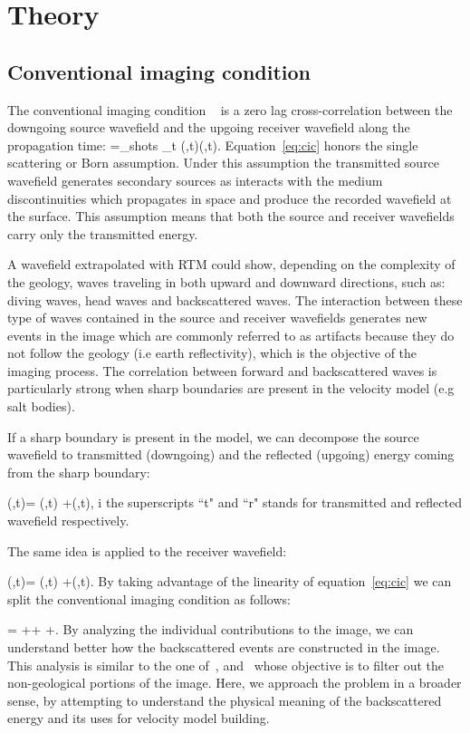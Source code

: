 \section{Theory}

\subsection{Conventional imaging condition}
The conventional imaging condition ~\citep{Claerbout:1985:IEI:3887}
is a zero lag cross-correlation between the downgoing source wavefield and the upgoing 
receiver wavefield along the propagation time:
%
\beq
\R=\sum_{shots} \sum_{t} \US(\xx,t)\UR(\xx,t).
\label{eq:cic}
\eeq
%
 Equation~\ref{eq:cic} honors the single scattering or Born assumption. Under this assumption the transmitted
source wavefield generates secondary sources as interacts with the medium discontinuities which propagates in 
space and produce the recorded wavefield at the surface. This assumption means that both the source and receiver
wavefields carry only the transmitted energy.

A wavefield extrapolated with RTM could show, depending on the complexity of the geology, waves traveling in both
upward and downward directions, such as: diving waves, head waves and backscattered waves. The interaction between
 these type of waves contained in the source and receiver wavefields generates new events in the image which are 
commonly referred to as artifacts because they do not follow the geology (i.e earth reflectivity), which is the objective 
of the imaging process. The correlation between forward and backscattered waves is particularly strong when
sharp boundaries are present in the velocity model (e.g salt bodies).

If a sharp boundary is present in the model, we can decompose the source wavefield to transmitted (downgoing) 
 and the reflected (upgoing) energy coming from the sharp boundary:

\beq
\US(\xx,t)= \USr(\xx,t) +\USt(\xx,t),
\label{eq:ssplit}
\eeq
i%
the superscripts ``t" and ``r" stands for transmitted and reflected wavefield respectively. 

The same idea is applied to the receiver wavefield:

\beq
\UR(\xx,t)= \URr(\xx,t) +\URt(\xx,t).
\label{eq:rsplit}
\eeq
%
By taking advantage of the linearity of equation~\ref{eq:cic}  we
can split the conventional imaging condition as follows:

\beq
\R= ++  +.
\label{eq:cicsplit}
\eeq
%
By analyzing the individual contributions to the image, we can understand better how the backscattered events
are constructed in the image. This analysis is similar to the one of~\cite{fei:3130}, and~\cite{liu:S29}
whose objective is to filter out the non-geological portions of the image. Here, we approach the problem 
in a broader sense, by attempting to understand the physical meaning of the backscattered energy and its
uses for velocity model building.


